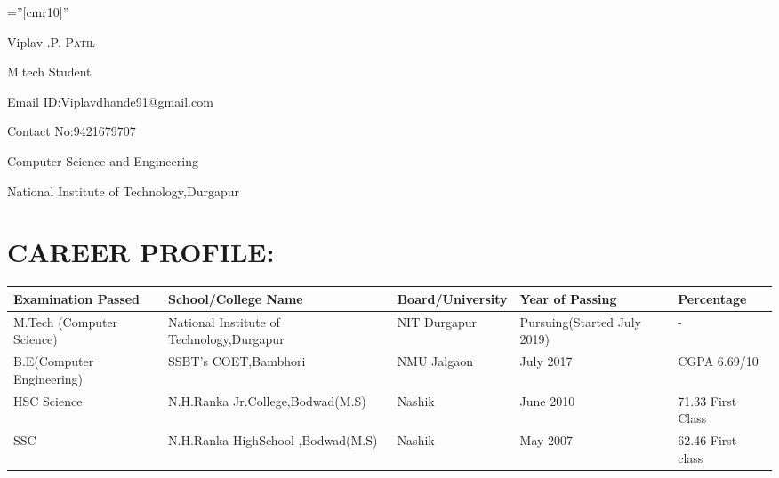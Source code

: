 \documentclass[a4paper,10pt]{article}
\begin{document}
\pagestyle{empty} %

\font\fb=''[cmr10]'' %

\par{\centering
		{\Huge Viplav .P. \textsc{Patil}
	}\bigskip\par}

\par	
{\large M.tech Student }
 
{\large Email ID:Viplavdhande91@gmail.com}

\par	
{\large Contact No:9421679707}

\par	
{\large Computer Science and Engineering 
 }
 
\par	
{\large National Institute of Technology,Durgapur 
 }
 


\section{}


\section{CAREER PROFILE:}

\begin{center}
\begin{tabular}{ | m{5.5em} | m{3.5cm}| m{3.5cm} | m{3cm} | m{3cm} | } 
\hline
\textbf{Examination Passed} & \textbf{School/College Name}  & \textbf{Board/University}  & \textbf{Year of Passing}  & \textbf{Percentage }  \\ 
\hline
M.Tech (Computer Science)  & National Institute of Technology,Durgapur & NIT Durgapur &Pursuing(Started July 2019) & -\\


\hline
B.E(Computer Engineering) & SSBT’s COET,Bambhori  & NMU Jalgaon  & July 2017  & CGPA 6.69/10 \\

\hline
HSC Science  & N.H.Ranka Jr.College,Bodwad(M.S) & Nashik & June 2010 & 71.33 First Class \\

\hline
SSC & N.H.Ranka HighSchool ,Bodwad(M.S) & Nashik & May 2007 & 62.46 First class \\ 
\hline
\end{tabular}
\end{center}
\end{document}
